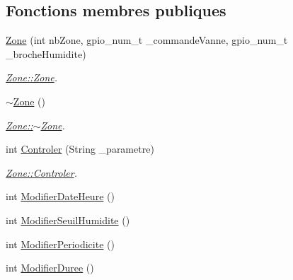 \subsection*{Fonctions membres publiques}
\begin{DoxyCompactItemize}
\item 
\hyperlink{class_zone_ae3e1df767b1138077d5a0c4b60b6be10}{Zone} (int nb\+Zone, gpio\+\_\+num\+\_\+t \+\_\+commande\+Vanne, gpio\+\_\+num\+\_\+t \+\_\+broche\+Humidite)
\begin{DoxyCompactList}\small\item\em \hyperlink{class_zone_ae3e1df767b1138077d5a0c4b60b6be10}{Zone\+::\+Zone}. \end{DoxyCompactList}\item 
\hyperlink{class_zone_a562607cb5c4120a9316c5e967a5c610b}{$\sim$\+Zone} ()
\begin{DoxyCompactList}\small\item\em \hyperlink{class_zone_a562607cb5c4120a9316c5e967a5c610b}{Zone\+::$\sim$\+Zone}. \end{DoxyCompactList}\item 
int \hyperlink{class_zone_a27c5d83a0f4a2c965cbf0b8ae5c5bd9e}{Controler} (String \+\_\+parametre)
\begin{DoxyCompactList}\small\item\em \hyperlink{class_zone_a27c5d83a0f4a2c965cbf0b8ae5c5bd9e}{Zone\+::\+Controler}. \end{DoxyCompactList}\item 
int \hyperlink{class_zone_aeb1ceb3e614cbfcd53e9565f6afefb59}{Modifier\+Date\+Heure} ()
\item 
int \hyperlink{class_zone_a1f6fc952bc1ceb3acda81669ce875c04}{Modifier\+Seuil\+Humidite} ()
\item 
int \hyperlink{class_zone_ade9182f137c6db1c7c29a7b367991c3d}{Modifier\+Periodicite} ()
\item 
int \hyperlink{class_zone_a4390b52a1631ec05bc3a796db50bc5dd}{Modifier\+Duree} ()
\end{DoxyCompactItemize}
